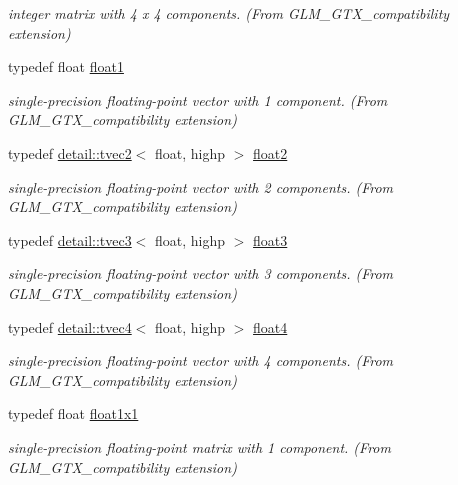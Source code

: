 \begin{DoxyCompactItemize}
\begin{DoxyCompactList}\small\item\em integer matrix with 4 x 4 components. (From G\+L\+M\+\_\+\+G\+T\+X\+\_\+compatibility extension) \end{DoxyCompactList}\item 
typedef float \hyperlink{group__gtx__compatibility_gae0ad1b0450320cda98bbbecb56bc3167}{float1}
\begin{DoxyCompactList}\small\item\em single-\/precision floating-\/point vector with 1 component. (From G\+L\+M\+\_\+\+G\+T\+X\+\_\+compatibility extension) \end{DoxyCompactList}\item 
typedef \hyperlink{structglm_1_1detail_1_1tvec2}{detail\+::tvec2}$<$ float, highp $>$ \hyperlink{group__gtx__compatibility_ga6ab0b791bbb15ef51a0e930a8710e6b1}{float2}
\begin{DoxyCompactList}\small\item\em single-\/precision floating-\/point vector with 2 components. (From G\+L\+M\+\_\+\+G\+T\+X\+\_\+compatibility extension) \end{DoxyCompactList}\item 
typedef \hyperlink{structglm_1_1detail_1_1tvec3}{detail\+::tvec3}$<$ float, highp $>$ \hyperlink{group__gtx__compatibility_ga7e0d8fa3501c0a7eaaca31adb6e02de2}{float3}
\begin{DoxyCompactList}\small\item\em single-\/precision floating-\/point vector with 3 components. (From G\+L\+M\+\_\+\+G\+T\+X\+\_\+compatibility extension) \end{DoxyCompactList}\item 
typedef \hyperlink{structglm_1_1detail_1_1tvec4}{detail\+::tvec4}$<$ float, highp $>$ \hyperlink{group__gtx__compatibility_gac0676d140051809309ca683c325bf439}{float4}
\begin{DoxyCompactList}\small\item\em single-\/precision floating-\/point vector with 4 components. (From G\+L\+M\+\_\+\+G\+T\+X\+\_\+compatibility extension) \end{DoxyCompactList}\item 
typedef float \hyperlink{group__gtx__compatibility_gaac1faa940ac1fbb32d4a315005b578af}{float1x1}
\begin{DoxyCompactList}\small\item\em single-\/precision floating-\/point matrix with 1 component. (From G\+L\+M\+\_\+\+G\+T\+X\+\_\+compatibility extension) \end{DoxyCompactList}\item 

\end{DoxyCompactItemize}
